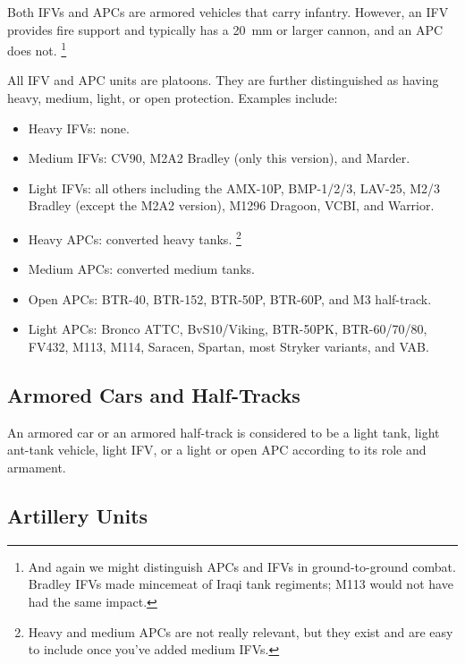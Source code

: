 \documentclass[10pt]{article}
\newcommand{\note}[1]{%
    \footnote{%
        \setlength{\parindent}{0pt}%
        \setlength{\parskip}{\smallskipamount}%
        #1
    }%
}
\begin{document}
Both IFVs and APCs are armored vehicles that carry infantry.
However, an IFV provides fire support and typically has a 20~mm or larger cannon, and an APC does not.%
\note{
    And again we might distinguish APCs and IFVs in ground-to-ground combat.
    Bradley IFVs made mincemeat of Iraqi tank regiments; M113 would not have had the same impact.
}
All IFV and APC units are platoons.
They are further distinguished as having heavy, medium, light, or open protection.
Examples include:

\begin{itemize}\raggedright

    \item Heavy IFVs: none.

    \item Medium IFVs: CV90, M2A2 Bradley (only this version), and Marder.

    \item Light IFVs: all others including the AMX-10P, BMP-1/2/3, LAV-25, M2/3 Bradley (except the M2A2 version), M1296 Dragoon, VCBI, and Warrior.

    \item Heavy APCs: converted heavy tanks.
        \note{
            Heavy and medium APCs are not really relevant, but they exist and are easy to include once you've added medium IFVs.
        }

    \item Medium APCs: converted medium tanks.

    \item Open APCs: BTR-40, BTR-152, BTR-50P, BTR-60P, and M3 half-track.

    \item Light APCs: Bronco ATTC, BvS10/Viking, BTR-50PK, BTR-60/70/80, FV432, M113, M114, Saracen, Spartan, most Stryker variants, and VAB.

\end{itemize}

\subsection{Armored Cars and Half-Tracks}

An armored car or an armored half-track is considered to be a light tank, light ant-tank vehicle, light IFV, or a light or open APC according to its role and armament.

\subsection{Artillery Units}
\end{document}
